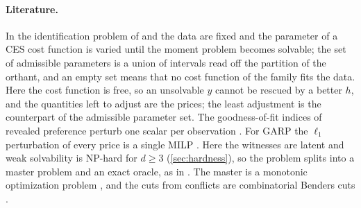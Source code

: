 \paragraph{Literature.} In the identification problem of \citet{Shananin1999} and \citet[Sect.~6]{AgaltsovMolchanovShananin2018} the data are fixed and the parameter of a CES cost function is varied until the moment problem becomes solvable; the set of admissible parameters is a union of intervals read off the partition of the orthant, and an empty set means that no cost function of the family fits the data. Here the cost function is free, so an unsolvable $y$ cannot be rescued by a better $h$, and the quantities left to adjust are the prices; the least adjustment is the counterpart of the admissible parameter set. The goodness-of-fit indices of revealed preference perturb one scalar per observation \citep{Cherchye2014}. For GARP the $\ell_1$ perturbation of every price is a single MILP \citep{DemuynckRehbeck2023}. Here the witnesses are latent and weak solvability is NP-hard for $d\ge3$ (\cref{sec:hardness}), so the problem splits into a master problem and an exact oracle, as in \citet{DeanMartin2016}. The master is a monotonic optimization problem \citep{Tuy2000,TuyAlKhayyalThach2005}, and the cuts from conflicts are combinatorial Benders cuts \citep{CodatoFischetti2006,FischettiSalvagninZanette2010}.

